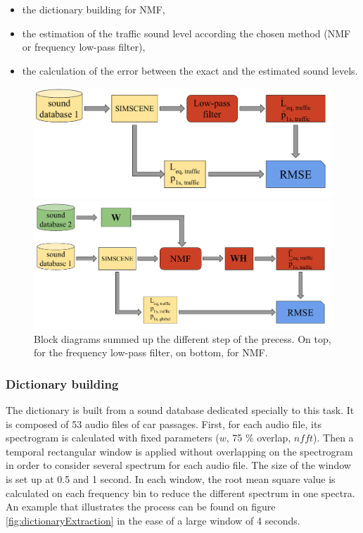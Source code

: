 \documentclass[twocolumn,a4paper,10pt]{article}
\begin{document}
\begin{itemize}
\item the dictionary building for NMF,
\item the estimation of the traffic sound level according the chosen method (NMF or frequency low-pass filter),
\item the calculation of the error between the exact and the estimated sound levels.\\
\end{itemize}

\begin{figure}[!t]
\centering
	\begin{minipage}[t]{.48\textwidth}
		\centering
		\includegraphics[width=.9\linewidth]{../image/bloc_diagram_filtrage_EN.pdf} 
	\end{minipage}
	\begin{minipage}[t]{.48\textwidth}
		\centering
		\includegraphics[width=.9\linewidth]{../image/bloc_diagram_NMF_EN.pdf} 
	\end{minipage}
	\caption{Block diagrams summed up the different step of the precess. On top, for the frequency low-pass filter, on bottom, for NMF.}
	\label{fig:block_diagram_protocol}
\end{figure}

\subsubsection{Dictionary building}

The dictionary is built from a sound database dedicated specially to this task. It is composed of 53 audio files of car passages. First, for each audio file, its spectrogram is calculated with fixed parameters ($w$, 75 $\%$ overlap, $nfft$). Then a temporal rectangular window is applied without overlapping on the spectrogram in order to consider several spectrum for each audio file. The size of the window is set up at 0.5 and 1 second. In each window, the root mean square value is calculated on each frequency bin to reduce the different spectrum in one spectra.  An example that illustrates the process can be found on figure \ref{fig:dictionaryExtraction} in the ease of a large window of 4 seconds. 
\end{document}

